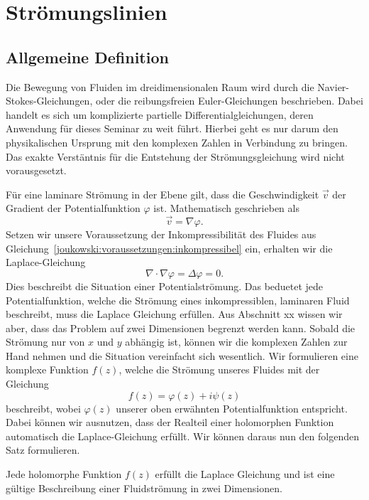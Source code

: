 \section{Strömungslinien}
\label{joukowski:sec:stroemungslinien}
	\subsection{Allgemeine Definition}
		Die Bewegung von Fluiden im dreidimensionalen Raum wird durch die Navier-Stokes-Gleichungen,
		oder die reibungsfreien Euler-Gleichungen beschrieben.
		Dabei handelt es sich um komplizierte partielle Differentialgleichungen,
		deren Anwendung für dieses Seminar zu weit führt.
		Hierbei geht es nur darum den physikalischen Ursprung mit den komplexen Zahlen in Verbindung zu bringen.
		Das exakte Verstäntnis für die Entstehung der Strömungsgleichung wird nicht vorausgesetzt.
		
		Für eine laminare Strömung in der Ebene gilt, dass die Geschwindigkeit $\vec{v}$ der Gradient der Potentialfunktion $\varphi$ ist.
		Mathematisch geschrieben als
		\[
			\vec{v}
			=
			\nabla \varphi.
		\]
		Setzen wir unsere Voraussetzung der Inkompressibilität des Fluides aus Gleichung~\eqref{joukowski:voraussetzungen:inkompressibel} ein,
		erhalten wir die Laplace-Gleichung
		\[
			\nabla \cdot \nabla \varphi
			=
			\Delta \varphi
			=
			0.
		\]
		Dies beschreibt die Situation einer Potentialströmung.
		Das beduetet jede Potentialfunktion, welche die Strömung eines inkompressiblen, laminaren Fluid beschreibt, muss die Laplace Gleichung erfüllen.
		Aus Abschnitt xx %
		wissen wir aber, dass das Problem auf zwei Dimensionen begrenzt werden kann.
		Sobald die Strömung nur von $x$ und $y$ abhängig ist,
		können wir die komplexen Zahlen zur Hand nehmen und die Situation vereinfacht sich wesentlich.
		Wir formulieren eine komplexe Funktion $f(z)$, welche die Strömung unseres Fluides mit der Gleichung
		\[
			f(z)
			= 
			\varphi(z) + i \psi(z)
		\]
		beschreibt, wobei $\varphi(z)$ unserer oben erwähnten Potentialfunktion entspricht.
		Dabei können wir ausnutzen, dass der Realteil einer holomorphen Funktion automatisch die Laplace-Gleichung erfüllt.
		Wir können daraus nun den folgenden Satz formulieren.
		
		\begin{satz}
			Jede holomorphe Funktion $f(z)$ erfüllt die Laplace Gleichung
			und ist eine gültige Beschreibung einer Fluidströmung in zwei Dimensionen.
			\label{joukowski:stroemungslinien:satz:holomorphe-funktion}
		\end{satz}
		
